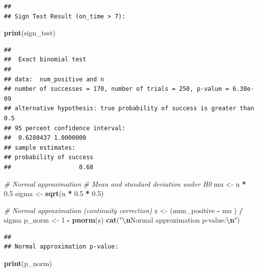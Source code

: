 \documentclass[
]{article}
\newenvironment{Shaded}{\begin{snugshade}}{\end{snugshade}}
\newcommand{\CommentTok}[1]{\textcolor[rgb]{0.56,0.35,0.01}{\textit{#1}}}
\newcommand{\DecValTok}[1]{\textcolor[rgb]{0.00,0.00,0.81}{#1}}
\newcommand{\FloatTok}[1]{\textcolor[rgb]{0.00,0.00,0.81}{#1}}
\newcommand{\FunctionTok}[1]{\textcolor[rgb]{0.13,0.29,0.53}{\textbf{#1}}}
\newcommand{\NormalTok}[1]{#1}
\newcommand{\OtherTok}[1]{\textcolor[rgb]{0.56,0.35,0.01}{#1}}
\newcommand{\SpecialCharTok}[1]{\textcolor[rgb]{0.81,0.36,0.00}{\textbf{#1}}}
\newcommand{\StringTok}[1]{\textcolor[rgb]{0.31,0.60,0.02}{#1}}
\begin{document}
\begin{verbatim}
## 
## Sign Test Result (on_time > 7):
\end{verbatim}

\begin{Shaded}
\begin{Highlighting}[]
\FunctionTok{print}\NormalTok{(sign\_test)}
\end{Highlighting}
\end{Shaded}

\begin{verbatim}
## 
##  Exact binomial test
## 
## data:  num_positive and n
## number of successes = 170, number of trials = 250, p-value = 6.38e-09
## alternative hypothesis: true probability of success is greater than 0.5
## 95 percent confidence interval:
##  0.6280437 1.0000000
## sample estimates:
## probability of success 
##                   0.68
\end{verbatim}

\begin{Shaded}
\begin{Highlighting}[]
\CommentTok{\# Normal approximation}
\CommentTok{\# Mean and standard deviation under H0}
\NormalTok{mu }\OtherTok{\textless{}{-}}\NormalTok{ n }\SpecialCharTok{*} \FloatTok{0.5}
\NormalTok{sigma }\OtherTok{\textless{}{-}} \FunctionTok{sqrt}\NormalTok{(n }\SpecialCharTok{*} \FloatTok{0.5} \SpecialCharTok{*} \FloatTok{0.5}\NormalTok{)}

\CommentTok{\# Normal approximation (continuity correction)}
\NormalTok{z }\OtherTok{\textless{}{-}}\NormalTok{ (num\_positive }\SpecialCharTok{{-}}\NormalTok{ mu ) }\SpecialCharTok{/}\NormalTok{ sigma}
\NormalTok{p\_norm }\OtherTok{\textless{}{-}} \DecValTok{1} \SpecialCharTok{{-}} \FunctionTok{pnorm}\NormalTok{(z)}
\FunctionTok{cat}\NormalTok{(}\StringTok{"}\SpecialCharTok{\textbackslash{}n}\StringTok{Normal approximation p{-}value:}\SpecialCharTok{\textbackslash{}n}\StringTok{"}\NormalTok{)}
\end{Highlighting}
\end{Shaded}

\begin{verbatim}
## 
## Normal approximation p-value:
\end{verbatim}

\begin{Shaded}
\begin{Highlighting}[]
\FunctionTok{print}\NormalTok{(p\_norm)}
\end{Highlighting}
\end{Shaded}
\end{document}
